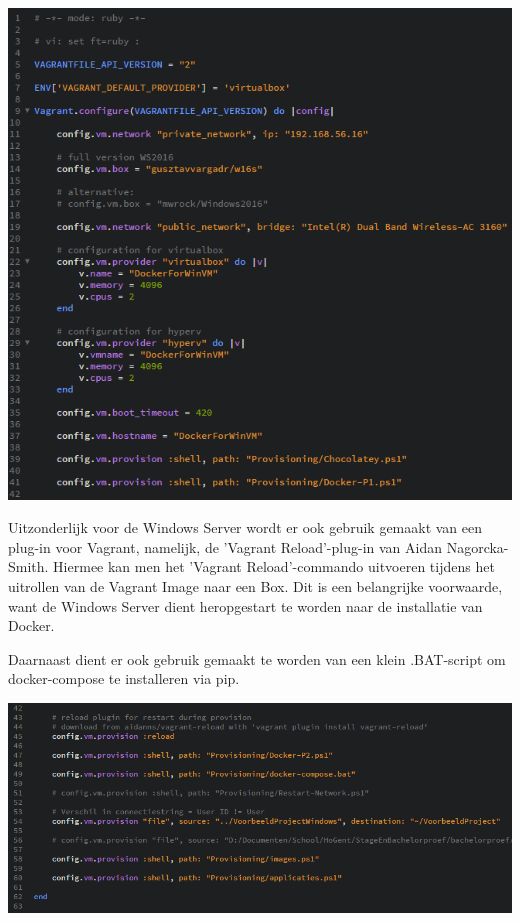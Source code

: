 \begin{center}
	\includegraphics[scale=0.75]{img/windowsvagrant01}
\end{center}

Uitzonderlijk voor de Windows Server wordt er ook gebruik gemaakt van een plug-in voor Vagrant, namelijk, de 'Vagrant Reload'-plug-in van Aidan Nagorcka-Smith. Hiermee kan men het 'Vagrant Reload'-commando uitvoeren tijdens het uitrollen van de Vagrant Image naar een Box. Dit is een belangrijke voorwaarde, want de Windows Server dient heropgestart te worden naar de installatie van Docker.

Daarnaast dient er ook gebruik gemaakt te worden van een klein .BAT-script om docker-compose te installeren via pip.

\begin{center}
	\includegraphics[scale=0.75]{img/windowsvagrant02}
\end{center}

